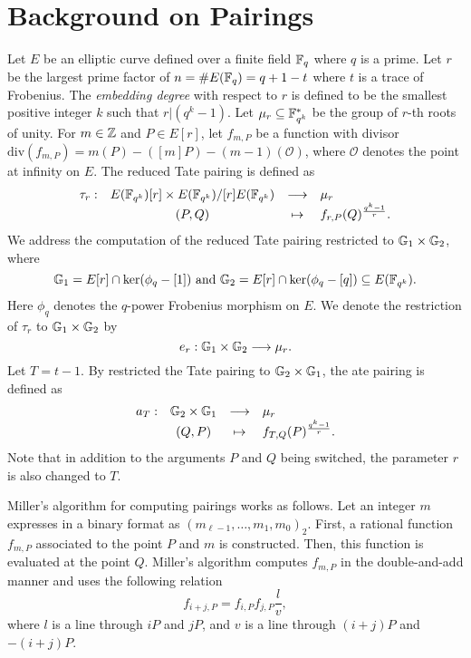 \section{Background on Pairings}
\label{sec:background}

Let $E$ be an elliptic curve defined over a finite field $\mathbb{F}_{q}$ where $q$ is a prime.
Let $r$ be the largest prime factor of $n = \#E(\mathbb{F}_{q}) = q + 1 - t$ where $t$ is a trace of Frobenius.
The \emph{embedding degree} with respect to $r$ is defined to be the smallest positive integer $k$ such that $r | (q^k-1)$.
Let $\mu_{r} \subseteq \mathbb{F}_{q^{k}}^{*}$ be the group of $r$-th roots of unity.
For $m \in \mathbb{Z}$ and $P \in E[r]$,
let $f_{m,P}$ be a function with divisor 
$\text{div}(f_{m,P}) = m(P) - ([m]P) - (m-1)(\mathcal{O})$,
where $\mathcal{O}$ denotes the point at infinity on $E$.
The reduced Tate pairing is defined as
\[\begin{array}{rccl}
\tau_{r} :	& E(\mathbb{F}_{q^{k}})[r] \times E(\mathbb{F}_{q^{k}})/[r]E(\mathbb{F}_{q^{k}})	& \longrightarrow	& \mu_{r} \\
		& (P,Q)								& \mapsto		& f_{r,P}(Q)^{\frac{q^{k}-1}{r}}.
\end{array}\]
We address the computation of the reduced Tate pairing restricted to $\mathbb{G}_{1} \times \mathbb{G}_{2}$, where
$$\mathbb{G}_{1} = E[r] \cap \ker(\phi_{q}-[1]) \text{ and }
\mathbb{G}_{2} = E[r] \cap \ker(\phi_{q} - [q]) \subseteq E(\mathbb{F}_{q^{k}}).$$
Here $\phi_{q}$ denotes the $q$-power Frobenius morphism on $E$.
We denote the restriction of $\tau_{r}$ to $\mathbb{G}_{1} \times \mathbb{G}_{2}$ by
$$e_{r} : \mathbb{G}_{1} \times \mathbb{G}_{2} \longrightarrow \mu_{r}.$$
Let $T = t-1$.
By restricted the Tate pairing to $\mathbb{G}_{2} \times \mathbb{G}_{1}$, the ate pairing is defined as
\[\begin{array}{rccl}
a_{T} :	& \mathbb{G}_{2} \times \mathbb{G}_{1}	& \longrightarrow	& \mu_{r} \\
	& (Q,P) 		& \mapsto		& f_{T,Q}(P)^{\frac{q^{k}-1}{r}}.
\end{array}\]
Note that in addition to the arguments $P$ and $Q$ being switched, the parameter $r$ is also changed to $T$.

Miller's algorithm for computing pairings works as follows.
Let an integer $m$ expresses in a binary format as $(m_{\ell-1},\dots,m_1,m_0)_2$.
First, a rational function $f_{m,P}$ associated to the point $P$ and $m$ is constructed.
Then, this function is evaluated at the point $Q$.
Miller's algorithm computes $f_{m,P}$ in the double-and-add manner
and uses the following relation
$$ f_{i+j,P} = f_{i,P} f_{j,P} \frac{l}{v}, $$
where $l$ is a line through $iP$ and $jP$,
and $v$ is a line through $(i+j)P$ and $-(i+j)P$.

